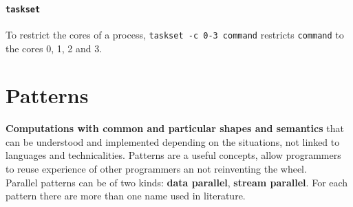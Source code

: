 \documentclass[10pt]{report}
\begin{document}
\paragraph{\texttt{taskset}} To restrict the cores of a process, \texttt{taskset -c 0-3 command} restricts \texttt{command} to the cores 0, 1, 2 and 3.

\section{Patterns}
\textbf{Computations with common and particular shapes and semantics} that can be understood and implemented depending on the situations, not linked to languages and technicalities. Patterns are a useful concepts, allow programmers to reuse experience of other programmers an not reinventing the wheel.\\
Parallel patterns can be of two kinds: \textbf{data parallel}, \textbf{stream parallel}. For each pattern there are more than one name used in literature.
\end{document}
